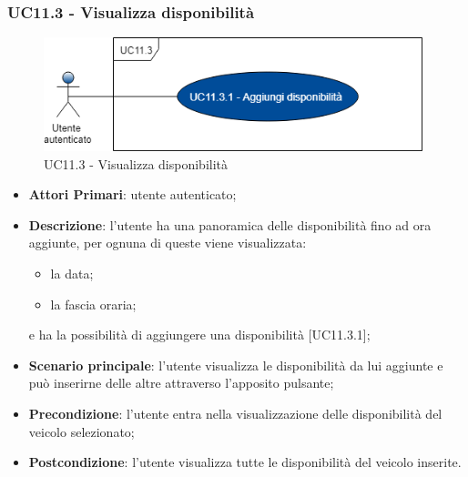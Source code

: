 \subsubsection{UC11.3 - Visualizza disponibilità}
\begin{figure}[H]
	\includegraphics[width=11cm]{res/images/UC11Disponibile.png}
	\centering
	\caption{UC11.3 - Visualizza disponibilità}
\end{figure}
\begin{itemize}
	\item \textbf{Attori Primari}: utente autenticato;
	\item \textbf{Descrizione}: l'utente ha una panoramica delle disponibilità fino ad ora aggiunte, per ognuna di queste viene visualizzata:
	\begin{itemize}
		\item la data;
		\item la fascia oraria;
	\end{itemize} 
	e ha la possibilità di aggiungere una disponibilità [UC11.3.1];
	\item \textbf{Scenario principale}: l'utente visualizza le disponibilità da lui aggiunte e può inserirne delle altre attraverso l'apposito pulsante;
	\item \textbf{Precondizione}: l'utente entra nella visualizzazione delle disponibilità del veicolo selezionato;
	\item \textbf{Postcondizione}: l'utente visualizza tutte le disponibilità del veicolo inserite. 
\end{itemize}
